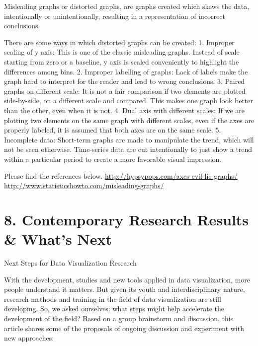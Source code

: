 \documentclass[]{book}
\theoremstyle{definition}
\theoremstyle{definition}
\theoremstyle{definition}
\theoremstyle{remark}
\begin{document}
Misleading graphs or distorted graphs, are graphs created which skews
the data, intentionally or unintentionally, resulting in a
representation of incorrect conclusions.

There are some ways in which distorted graphs can be created: 1.
Improper scaling of y axis: This is one of the classic misleading
graphs. Instead of scale starting from zero or a baseline, y axis is
scaled conveniently to highlight the differences among bins. 2. Improper
labelling of graphs: Lack of labels make the graph hard to interpret for
the reader and lead to wrong conclusions. 3. Paired graphs on different
scale: It is not a fair comparison if two elements are plotted
side-by-side, on a different scale and compared. This makes one graph
look better than the other, even when it is not. 4. Dual axis with
different scales: If we are plotting two elements on the same graph with
different scales, even if the axes are properly labeled, it is assumed
that both axes are on the same scale. 5. Incomplete data: Short-term
graphs are made to manipulate the trend, which will not be seen
otherwise. Time-series data are cut intentionally to just show a trend
within a particular period to create a more favorable visual impression.

Please find the references below.
\url{http://hypsypops.com/axes-evil-lie-graphs/}
\url{http://www.statisticshowto.com/misleading-graphs/}

\section{8. Contemporary Research Results \& What's
Next}\label{contemporary-research-results-whats-next}

Next Steps for Data Visualization Research

With the development, studies and new tools applied in data
visualization, more people understand it matters. But given its youth
and interdisciplinary nature, research methods and training in the field
of data visualization are still developing. So, we asked ourselves: what
steps might help accelerate the development of the field? Based on a
group brainstorm and discussion, this article shares some of the
proposals of ongoing discussion and experiment with new approaches:
\end{document}
